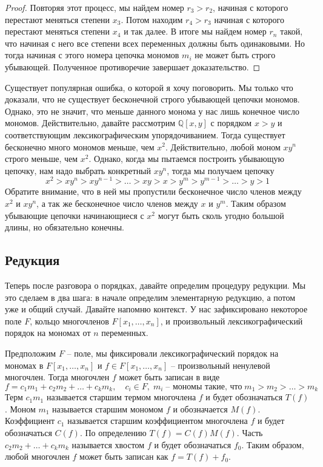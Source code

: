 \begin{proof}
Повторяя этот процесс, мы найдем номер $r_3 > r_2$, начиная с которого перестают меняться степени $x_3$.
Потом находим $r_4>r_3$ начиная с которого перестают меняться степени $x_4$ и так далее.
В итоге мы найдем номер $r_n$ такой, что начиная с него все степени всех переменных должны быть одинаковыми.
Но тогда начиная с этого номера цепочка мономов $m_i$ не может быть строго убывающей.
Полученное противоречие завершает доказательство.
\end{proof}


\begin{remark}
Существует популярная ошибка, о которой я хочу поговорить.
Мы только что доказали, что не существует бесконечной строго убывающей цепочки мономов.
Однако, это не значит, что меньше данного монома у нас лишь конечное число мономов.
Действительно, давайте рассмотрим $\mathbb Q[x, y]$ с порядком $x > y$ и соответствующим лексикографическим упорядочиванием.
Тогда существует бесконечно много мономов меньше, чем $x^2$.
Действительно, любой моном $xy^n$ строго меньше, чем $x^2$.
Однако, когда мы пытаемся построить убывающую цепочку, нам надо выбрать конкретный $xy^n$, тогда мы получаем цепочку
\[
x^2 > xy^n > xy^{n-1} > \ldots > xy > x > y^m > y^{m-1} > \ldots > y > 1
\]
Обратите внимание, что в ней мы пропустили бесконечное число членов между $x^2$ и $xy^n$, а так же бесконечное число членов между $x$ и $y^m$.
Таким образом убывающие цепочки начинающиеся с $x^2$ могут быть сколь угодно большой длины, но обязательно конечны.
\end{remark}


\subsection{Редукция}

Теперь после разговора о порядках, давайте определим процедуру редукции.
Мы это сделаем в два шага: в начале определим элементарную редукцию, а потом уже и общий случай.
Давайте напомню контекст.
У нас зафиксировано некоторое поле $F$, кольцо многочленов $F[x_1,\ldots,x_n]$, и произвольный лексикографический порядок на мономах от $n$ переменных.

\begin{definition}
Предположим $F$ -- поле, мы фиксировали лексикографический порядок на мономах в $F[x_1,\ldots,x_n]$ и $f\in F[x_1,\ldots,x_n]$ -- произвольный ненулевой многочлен.
Тогда многочлен $f$ может быть записан в виде
\[
f = c_1 m_1 + c_2 m_2 + \ldots + c_k m_k,\quad c_i\in F,\;m_i\;\text{-- мономы такие, что}\; m_1 > m_2 >\ldots>m_k
\]
Терм $c_1m_1$ называется старшим термом многочлена $f$ и будет обозначаться $T(f)$.
Моном $m_1$ называется старшим мономом $f$ и обозначается $M(f)$.
Коэффициент $c_1$ называется старшим коэффициентом многочлена $f$ и будет обозначаться $C(f)$.
По определению $T(f) = C(f) M(f)$.
Часть $c_2m_2 + \ldots + c_k m_k$ называется хвостом $f$ и будет обозначаться $f_0$.
Таким образом, любой многочлен $f$ может быть записан как $f = T(f) + f_0$.
\end{definition}


